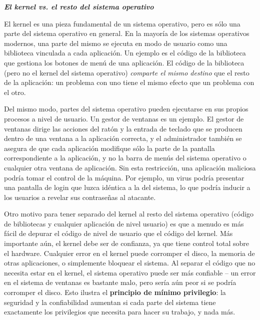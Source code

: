 \documentclass[10pt]{book}
\begin{document}
\textit{\textbf{El kernel vs. el resto del sistema operativo}}

El kernel es una pieza fundamental de un sistema operativo, pero es sólo una parte del sistema operativo en general. En la mayoría de los sistemas operativos modernos, una parte del mismo se ejecuta en modo de usuario como una biblioteca vinculada a cada aplicación. Un ejemplo es el código de la biblioteca que gestiona los botones de menú de una aplicación. El código de la biblioteca (pero no el kernel del sistema operativo) \textit{comparte el mismo destino} que el resto de la aplicación: un problema con uno tiene el mismo efecto que un problema con el otro.

Del mismo modo, partes del sistema operativo pueden ejecutarse en sus propios procesos a nivel de usuario. Un gestor de ventanas es un ejemplo. El gestor de ventanas dirige las acciones del ratón y la entrada de teclado que se producen dentro de una ventana a la aplicación correcta, y el administrador también se asegura de que cada aplicación modifique sólo la parte de la pantalla correspondiente a la aplicación, y no la barra de menús del sistema operativo o cualquier otra ventana de aplicación. Sin esta restricción, una aplicación maliciosa podría tomar el control de la máquina. Por ejemplo, un virus podría presentar una pantalla de login que luzca idéntica a la del sistema, lo que podría inducir a los usuarios a revelar sus contraseñas al atacante.

Otro motivo para tener separado del kernel al resto del sistema operativo (código de bibliotecas y cualquier aplicación de nivel usuario) es que a menudo es más fácil de depurar el código de nivel de usuario que el código del kernel. Más importante aún, el kernel debe ser de confianza, ya que tiene control total sobre el hardware. Cualquier error en el kernel puede corromper el disco, la memoria de otras aplicaciones, o simplemente bloquear el sistema. Al separar el código que no necesita estar en el kernel, el sistema operativo puede ser más confiable -- un error en el sistema de ventanas es bastante malo, pero sería aún peor si se podría corromper el disco. Esto ilustra el \textbf{principio de mínimo privilegio}: la seguridad y la confiabilidad aumentan si cada parte del sistema tiene exactamente los privilegios que necesita para hacer su trabajo, y nada más.
\end{document}
